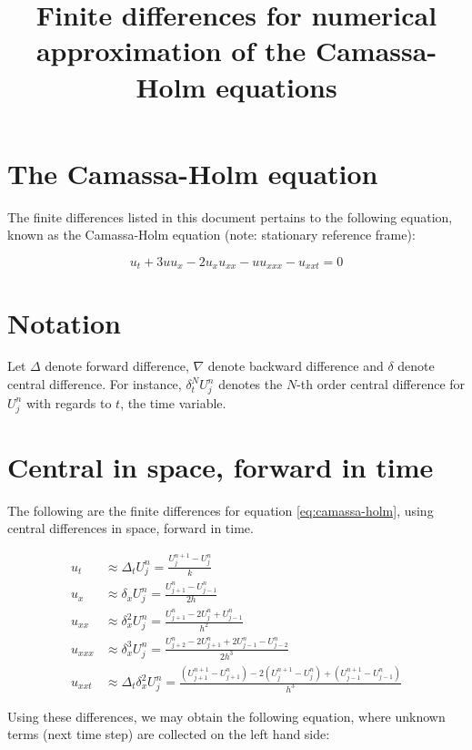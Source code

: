 \documentclass[fleqn]{article}
\begin{document}
\title{Finite differences for numerical approximation of the Camassa-Holm equations}
\maketitle

\section*{The Camassa-Holm equation}
The finite differences listed in this document pertains to the following equation, known as the Camassa-Holm equation (note: stationary reference frame):

\begin{equation}
\label{eq:camassa-holm}
u_t + 3uu_x - 2u_xu_{xx} - uu_{xxx} - u_{xxt} = 0
\end{equation}

\section*{Notation}
Let $\Delta$ denote forward difference, $\nabla$ denote backward difference and $\delta$ denote central difference. For instance, $\delta_t^N U_j^n$ denotes the $N$-th order central difference for $U_j^n$ with regards to $t$, the time variable.

\section*{Central in space, forward in time}
The following are the finite differences for equation \eqref{eq:camassa-holm}, using central differences in space, forward in time.

\begin{align}
u_t &\approx \Delta_t U_j^n = \frac{U_{j}^{n+1} - U_{j}^{n}}{k} \\
u_x &\approx \delta_x U_j^n = \frac{U_{j+1}^n - U_{j-1}^n}{2h} \\
u_{xx} &\approx \delta_x^2 U_j^n = \frac{U_{j+1}^n - 2U_j^n + U_{j-1}^n}{h^2} \\
u_{xxx} &\approx \delta_x^3 U_j^n = \frac{U_{j+2}^n - 2U_{j+1}^n + 2U_{j-1}^n - U_{j-2}^n}{2h^3} \\
u_{xxt} &\approx \Delta_t \delta_x^2 U_j^n = \frac{(U_{j+1}^{n+1} - U_{j+1}^n) - 2(U_j^{n+1} - U_j^n) + (U_{j-1}^{n+1} - U_{j-1}^n)}{h^3}
\end{align}

Using these differences, we may obtain the following equation, where unknown terms (next time step) are collected on the left hand side:
\end{document}
